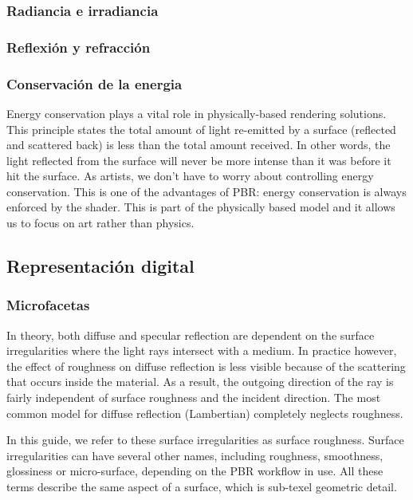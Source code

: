     \subsubsection{Radiancia e irradiancia}
    \subsubsection{Reflexi\'on y refracci\'on}
    \subsubsection{Conservaci\'on de la energia}
        Energy conservation plays a vital role in physically-based rendering solutions. This
        principle states the total amount of light re-emitted by a surface (reflected and scattered
        back) is less than the total amount received. In other words, the light reflected from the
        surface will never be more intense than it was before it hit the surface. As artists, we
        don’t have to worry about controlling energy conservation. This is one of the advantages of
        PBR: energy conservation is always enforced by the shader. This is part of the physically
        based model and it allows us to focus on art rather than physics.
    \newpage

    \subsection{Representaci\'on digital}
        \subsubsection{Microfacetas}
            In theory, both diffuse and specular reflection are dependent on the surface
            irregularities where the light rays intersect with a medium. In practice however, the
            effect of roughness on diffuse reflection is less visible because of the scattering
            that occurs inside the material. As a result, the outgoing direction of the ray is
            fairly independent of surface roughness and the incident direction. The most common
            model for diffuse reflection (Lambertian) completely neglects roughness.

            In this guide, we refer to these surface irregularities as surface roughness. Surface
            irregularities can have several other names, including roughness, smoothness,
            glossiness or micro-surface, depending on the PBR workflow in use. All these terms
            describe the same aspect of a surface, which is sub-texel geometric detail.
            
